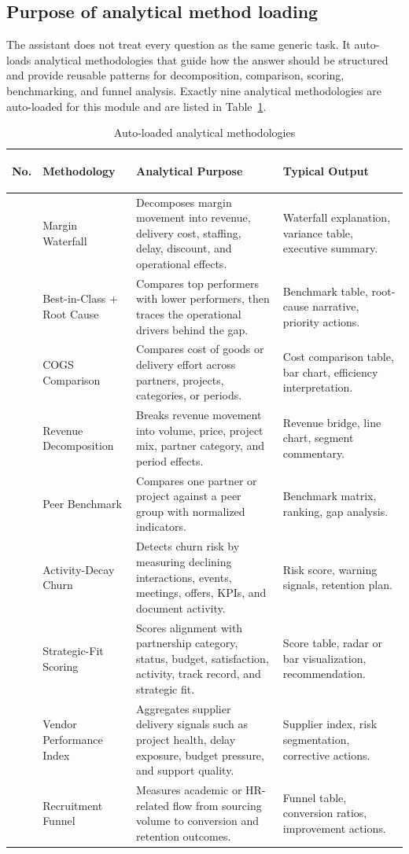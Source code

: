\subsection{Purpose of analytical method loading}
The assistant does not treat every question as the same generic task. It auto-loads analytical methodologies that guide how the answer should be structured and provide reusable patterns for decomposition, comparison, scoring, benchmarking, and funnel analysis. Exactly nine analytical methodologies are auto-loaded for this module and are listed in Table~\ref{tab:chapter6-methodologies}.
\begin{table}[H]
  \centering
  \caption{Auto-loaded analytical methodologies}
  \label{tab:chapter6-methodologies}
  \begin{tabularx}{\textwidth}{>{\bfseries\raggedright\arraybackslash}p{1cm}>{\raggedright\arraybackslash}p{3.7cm}X>{\raggedright\arraybackslash}p{3.2cm}}
    \toprule
    No. & Methodology & Analytical Purpose & Typical Output \\
    \midrule
    1 & Margin Waterfall & Decomposes margin movement into revenue, delivery cost, staffing, delay, discount, and operational effects. & Waterfall explanation, variance table, executive summary. \\
    2 & Best-in-Class + Root Cause & Compares top performers with lower performers, then traces the operational drivers behind the gap. & Benchmark table, root-cause narrative, priority actions. \\
    3 & COGS Comparison & Compares cost of goods or delivery effort across partners, projects, categories, or periods. & Cost comparison table, bar chart, efficiency interpretation. \\
    4 & Revenue Decomposition & Breaks revenue movement into volume, price, project mix, partner category, and period effects. & Revenue bridge, line chart, segment commentary. \\
    5 & Peer Benchmark & Compares one partner or project against a peer group with normalized indicators. & Benchmark matrix, ranking, gap analysis. \\
    6 & Activity-Decay Churn & Detects churn risk by measuring declining interactions, events, meetings, offers, KPIs, and document activity. & Risk score, warning signals, retention plan. \\
    7 & Strategic-Fit Scoring & Scores alignment with partnership category, status, budget, satisfaction, activity, track record, and strategic fit. & Score table, radar or bar visualization, recommendation. \\
    8 & Vendor Performance Index & Aggregates supplier delivery signals such as project health, delay exposure, budget pressure, and support quality. & Supplier index, risk segmentation, corrective actions. \\
    9 & Recruitment Funnel & Measures academic or HR-related flow from sourcing volume to conversion and retention outcomes. & Funnel table, conversion ratios, improvement actions. \\
    \bottomrule
  \end{tabularx}
\end{table}
